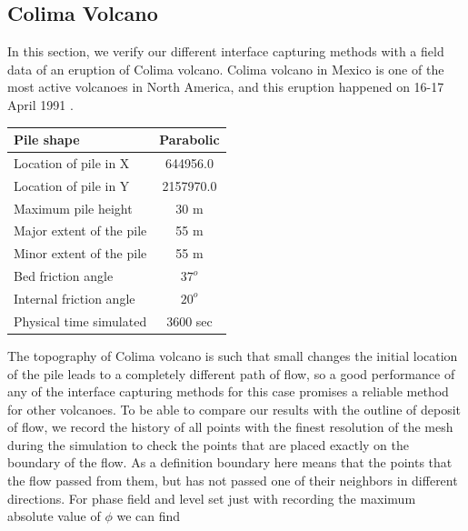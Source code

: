\documentclass[letterpaper,10pt]{article}
\begin{document}
\subsection{Colima Volcano}
In this section, we verify our different interface capturing methods with a field data of an eruption of Colima volcano. 
Colima volcano in Mexico is one of the most active volcanoes in North America, and this eruption happened on 16-17 April 1991 \cite{Charbonnier2008}. 
\begin{center}
        \begin{tabular}{|l|c|}
                \hline
                Pile shape       & Parabolic \\
                \hline
                Location of pile in X     & 644956.0 \\
                \hline
                Location of pile in Y     & 2157970.0 \\
                \hline
                Maximum pile height       & 30 m \\
                \hline
                Major extent of the pile  & 55 m \\
                \hline
                Minor extent of the pile  & 55 m \\
                \hline           
                Bed friction angle        & $37^o$ \\
                \hline
                Internal friction angle  & $20^o$ \\
                \hline
                Physical time simulated  & 3600 sec \\
                \hline
        \end{tabular}
\end{center}
The topography of Colima volcano is such that small changes the initial location of the pile leads to a completely different 
path of flow, so a good performance of any of the interface capturing methods for this case promises a reliable method for other volcanoes.
To be able to compare our results with the outline of deposit of flow, we record the history of all points with the finest 
resolution of the mesh during the simulation to check the points that are placed exactly on the boundary of the flow. 
As a definition boundary here means that the points that the flow passed from them, but has not passed one of their neighbors 
in different directions. For phase field and level set just with recording the maximum absolute value of $ \phi $ we can find 
\end{document}
